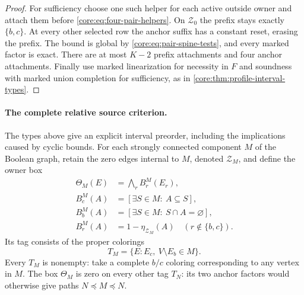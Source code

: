 \begin{proof}
For sufficiency choose one such helper for each active outside owner
and attach them before \eqref{core:eq:four-pair-helpers}.
On $\mathcal Z_0$ the prefix stays exactly $\{b,c\}$.
At every other selected row the anchor suffix has a constant reset,
erasing the prefix. The bound is global by
\eqref{core:eq:pair-spine-tests}, and every marked factor is exact.
There are at most $K-2$ prefix attachments and four anchor attachments.
Finally use marked linearization for necessity in $F$ and soundness
with marked union completion for sufficiency, as in
\cref{core:thm:profile-interval-types}.
\end{proof}

\paragraph{The complete relative source criterion.}
The types above give an explicit interval preorder, including the
implications caused by cyclic bounds. For each strongly connected
component $M$ of the Boolean graph, retain the zero edges internal to
$M$, denoted $\mathcal Z_M$, and define the owner box
\begin{align*}
 \Theta_M(E)&=\bigwedge_r B^M_r(E_r),\\
 B^M_c(A)&=[\exists S\in M:\ A\subseteq S],\\
 B^M_b(A)&=[\exists S\in M:\ S\cap A=\varnothing],\\
 B^M_r(A)&=1-\eta_{\mathcal Z_M}(A)\quad(r\notin\{b,c\}).
\end{align*}
Its tag consists of the proper colorings
\[
 T_M=\{E:E_c,\ V\setminus E_b\in M\}.
\]
Every $T_M$ is nonempty: take a complete $b/c$ coloring corresponding
to any vertex in $M$.
The box $\Theta_M$ is zero on every other tag $T_N$: its two anchor
factors would otherwise give paths $N\preceq M\preceq N$.

